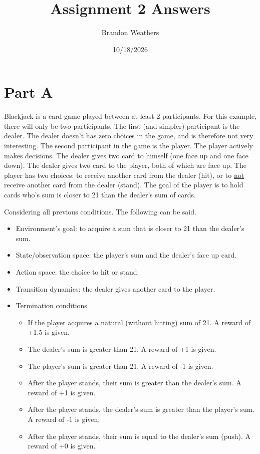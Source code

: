 \documentclass[11pt]{article}
\author{Brandon Weathers}
\date{10/18/2026}
\title{Assignment 2 Answers}
\begin{document}
\maketitle
\tableofcontents

\section{Part A}
\label{sec:org3ee0ca7}
Blackjack is a card game played between at least 2 participants.
For this example, there will only be two participants.
The first (and simpler) participant is the dealer.
The dealer doesn't has zero choices in the game, and is therefore not very interesting.
The second participant in the game is the player.
The player actively makes decisions.
The dealer gives two card to himself (one face up and one face down).
The dealer gives two card to the player, both of which are face up.
The player has two choices: to receive another card from the dealer (hit), or to \uline{not} receive another card from the dealer (stand).
The goal of the player is to hold cards who's sum is closer to 21 than the dealer's sum of cards.

Considering all previous conditions. The following can be said.
\begin{itemize}
\item Environment's goal: to acquire a sum that is closer to 21 than the dealer's sum.
\item State/observation space: the player's sum and the dealer's face up card.
\item Action space: the choice to hit or stand.
\item Transition dynamics: the dealer gives another card to the player.
\item Termination conditions
\begin{itemize}
\item If the player acquires a natural (without hitting) sum of 21. A reward of +1.5 is given.
\item The dealer's sum is greater than 21. A reward of +1 is given.
\item The player's sum is greater than 21. A reward of -1 is given.
\item After the player stands, their sum is greater than the dealer's sum. A reward of +1 is given.
\item After the player stands, the dealer's sum is greater than the player's sum. A reward of -1 is given.
\item After the player stands, their sum is equal to the dealer's sum (push). A reward of +0 is given.
\end{itemize}
\end{itemize}
\end{document}
